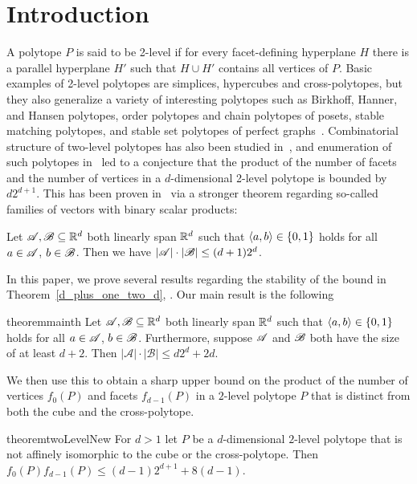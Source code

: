 \section{Introduction}

A polytope $P$ is said to be 2-level if for every facet-defining hyperplane $H$ there is a parallel hyperplane $H'$ such that $H \cup H'$ contains all vertices of $P$. Basic examples of 2-level polytopes are simplices, hypercubes and cross-polytopes, but they also generalize a variety of interesting polytopes such as Birkhoff, Hanner, and Hansen polytopes, order polytopes and chain polytopes of posets, stable matching polytopes, and stable set polytopes of perfect graphs~\cite{aprile18}. Combinatorial structure of two-level polytopes has also been studied in~\cite{fiorini16}, and enumeration of such polytopes in~\cite{bohn18} led to a conjecture that the product of the number of facets and the number of vertices in a $d$-dimensional 2-level polytope is bounded by $d 2^{d+1}$. This has been proven in~\cite{kupavskii22} via a stronger theorem regarding so-called families of vectors with binary scalar products:
\begin{theorem}
    \label{d_plus_one_two_d}
    Let ${\mathscr{A}},{\mathscr{B}} \subseteq {\mathbb{R}}^d$ both linearly span ${\mathbb{R}}^d$ such that $\langle a, b\rangle \in \{0,1\}$ holds for all $a \in {\mathscr{A}}$, $b \in {\mathscr{B}}$.
    Then we have $|{\mathscr{A}}| \cdot |{\mathscr{B}}| \le (d+1) 2^d$.
\end{theorem}

\noindent In this paper, we prove several results regarding the stability of the bound in Theorem~\ref{d_plus_one_two_d}, . Our main result is the following

\begin{restatable}[]{theorem}{mainth}\label{d2d_plus_2d}
     Let ${\mathscr{A}},{\mathscr{B}} \subseteq {\mathbb{R}}^d$ both linearly span ${\mathbb{R}}^d$ such that $\langle a, b\rangle \in \{0,1\}$ holds for all $a \in {\mathscr{A}}$, $b \in {\mathscr{B}}$. Furthermore, suppose ${\mathscr{A}}$ and ${\mathscr{B}}$ both have the size of at least $d+2$. Then $\left|\mathcal{A}\right| \cdot\left|\mathcal{B}\right| \leq d 2^d + 2d$.
\end{restatable}

\noindent We then use this to obtain a sharp upper bound on the product of the number of vertices $f_0(P)$ and facets $f_{d-1}(P)$ in a $2$-level polytope $P$ that is distinct from both the cube and the cross-polytope.

\begin{restatable}{theorem}{twoLevelNew}
    \label{two_level_new_bound}
    For $d>1$ let $P$ be a $d$-dimensional $2$-level polytope that is not affinely isomorphic to the cube or the cross-polytope. Then $f_0(P) f_{d-1}(P) \leq \left(d-1\right) 2^{d+1} + 8\left(d-1\right)$.
\end{restatable}

